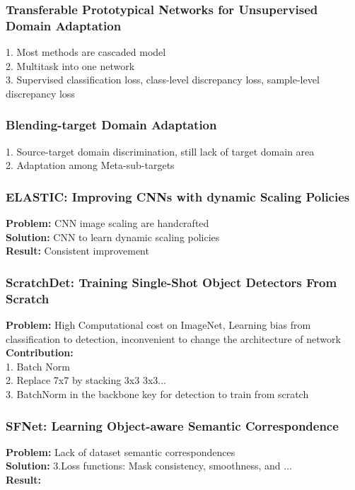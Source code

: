 \subsubsection{Transferable Prototypical Networks for Unsupervised Domain Adaptation}
    1. Most methods are cascaded model \\
    2. Multitask into one network \\
    3. Supervised classification loss, class-level discrepancy loss, sample-level discrepancy loss \\
\subsubsection{Blending-target Domain Adaptation}
    1. Source-target domain discrimination, still lack of target domain area \\
    2. Adaptation among Meta-sub-targets \\
\subsubsection{ELASTIC: Improving CNNs with dynamic Scaling Policies}
    {\bf Problem:} CNN image scaling are handcrafted \\
    {\bf Solution:} CNN to learn dynamic scaling policies \\
    {\bf Result:} Consistent improvement \\
\subsubsection{ScratchDet: Training Single-Shot Object Detectors From Scratch}
    {\bf Problem:} High Computational cost on ImageNet, Learning bias from classification to detection, inconvenient to change the architecture of network \\
    {\bf Contribution:}  \\
        1. Batch Norm \\
        2. Replace 7x7 by stacking 3x3 3x3... \\
        3. BatchNorm in the backbone key for detection to train from scratch \\
\subsubsection{SFNet: Learning Object-aware Semantic Correspondence}
    {\bf Problem:} Lack of dataset semantic correspondences \\
    {\bf Solution:} 3.Loss functions: Mask consistency, smoothness, and ... \\
    {\bf Result:}  \\
